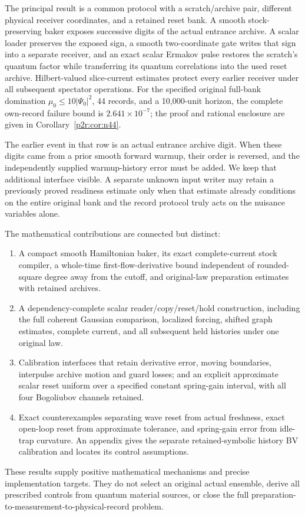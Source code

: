 \documentclass[11pt]{article}
\numberwithin{equation}{section}
\theoremstyle{definition}
\theoremstyle{remark}
\begin{document}
The principal result is a common protocol with a scratch/archive pair,
different physical receiver coordinates, and a retained reset bank.
A smooth stock-preserving baker exposes successive digits of the actual
entrance archive. A scalar loader preserves the exposed sign, a smooth
two-coordinate gate writes that sign into a separate receiver, and an
exact scalar Ermakov pulse restores the scratch's quantum factor while
transferring its quantum correlations into the used reset archive.
Hilbert-valued slice-current estimates protect every earlier receiver
under all subsequent spectator operations. For the specified original
full-bank domination $\mu_0\leq10|\Psi_0|^2$, 44 records, and a
10,000-unit horizon, the complete own-record failure bound is
$2.641\times10^{-7}$; the proof and rational enclosure are given in
Corollary~\ref{p2r:cor:n44}.

The earlier event in that row is an actual entrance archive digit.
When these digits came from a prior smooth forward warmup, their order
is reversed, and the independently supplied warmup-history error must
be added. We keep that additional interface visible. A separate unknown
input writer may retain a previously proved readiness estimate only
when that estimate already conditions on the entire original bank and
the record protocol truly acts on the nuisance variables alone.

The mathematical contributions are connected but distinct:
\begin{enumerate}
\item A compact smooth Hamiltonian baker, its exact complete-current
stock compiler, a whole-time first-flow-derivative bound independent
of rounded-square degree away from the cutoff, and original-law
preparation estimates with retained archives.
\item A dependency-complete scalar reader/copy/reset/hold construction,
including the full coherent Gaussian comparison, localized forcing,
shifted graph estimates, complete current, and all subsequent held
histories under one original law.
\item Calibration interfaces that retain derivative error, moving
boundaries, interpulse archive motion and guard losses; and an explicit
approximate scalar reset uniform over a specified constant spring-gain
interval, with all four Bogoliubov channels retained.
\item Exact counterexamples separating wave reset from actual freshness,
exact open-loop reset from approximate tolerance, and spring-gain error
from idle-trap curvature. An appendix gives the separate retained-symbolic
history BV calibration and locates its control assumptions.
\end{enumerate}
These results supply positive mathematical mechanisms and precise
implementation targets. They do not select an original actual ensemble,
derive all prescribed controls from quantum material sources, or close
the full preparation-to-measurement-to-physical-record problem.
\end{document}
